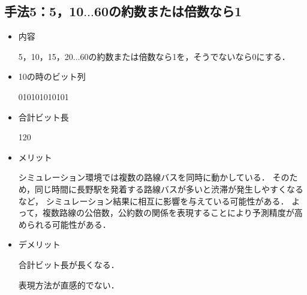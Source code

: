 \documentclass[main]{subfiles}
\begin{document}
        \subsection{手法5：5，10$\dots$60の約数または倍数なら1}
        \begin{itemize}
            \item 内容
            
                5，10，15，20$\dots$60の約数または倍数なら1を，そうでないなら0にする．
            \item 10の時のビット列
                
                010101010101
            \item 合計ビット長
            
                120
            \item メリット
            
                シミュレーション環境では複数の路線バスを同時に動かしている．
                そのため，同じ時間に長野駅を発着する路線バスが多いと渋滞が発生しやすくなるなど，
                シミュレーション結果に相互に影響を与えている可能性がある．
                よって，複数路線の公倍数，公約数の関係を表現することにより予測精度が高められる可能性がある．
            \item デメリット
                
                合計ビット長が長くなる．

                表現方法が直感的でない．
            
        \end{itemize}
\end{document}
